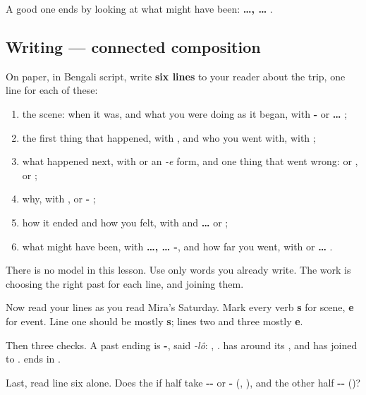 A good one ends by looking at what might have been: \textbf{ …,  … }.

\subsection*{Writing — connected composition}
On paper, in Bengali script, write \textbf{six lines} to your reader about the trip, one line for each of these:

\begin{enumerate}
\raggedright
  \item the scene: when it was, and what you were doing as it began, with \textbf{-} or \textbf{ … };
  \item the first thing that happened, with \textbf{}, and who you went with, with \textbf{};
  \item what happened next, with \textbf{} or an \emph{-e} form, and one thing that went wrong: \textbf{ } or \textbf{ }, or \textbf{};
  \item why, with \textbf{}, \textbf{} or \textbf{- };
  \item how it ended and how you felt, with \textbf{} and \textbf{ … } or \textbf{ };
  \item what might have been, with \textbf{ …,  … -}, and how far you went, with \textbf{} or \textbf{ … }.
\end{enumerate}

There is no model in this lesson. Use only words you already write. The work is choosing the right past for each line, and joining them.

\begin{tcolorbox}[breakable,colback=teal!4,colframe=teal!35!black,title={Before you move on}]
Now read your lines as you read Mira's Saturday. Mark every verb \textbf{s} for scene, \textbf{e} for event. Line one should be mostly \textbf{s}; lines two and three mostly \textbf{e}.

Then three checks. A past ending is \textbf{-}, said \emph{-lô}: \textbf{}, \textbf{}. \textbf{} has \textbf{} around its \textbf{}, and \textbf{} has \textbf{} joined to \textbf{}. \textbf{} ends in \textbf{}.

Last, read line six alone. Does the if half take \textbf{--} or \textbf{-} (\textbf{}, \textbf{}), and the other half \textbf{--} (\textbf{})?
\end{tcolorbox}

